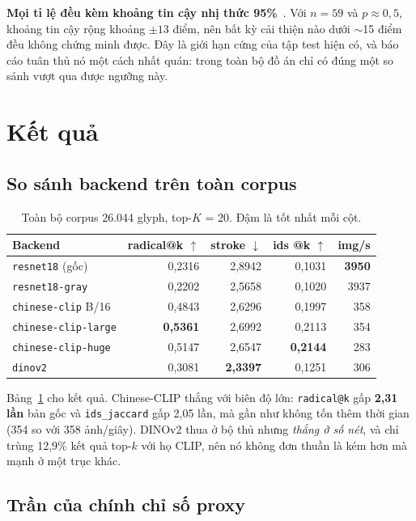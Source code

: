\documentclass[conference,a4paper]{IEEEtran}
\newcommand{\code}[1]{{\small\texttt{#1}}}
\begin{document}
\textbf{Mọi tỉ lệ đều kèm khoảng tin cậy nhị thức 95\%}~\cite{wilson}. Với $n = 59$ và $p \approx
0{,}5$, khoảng tin cậy rộng khoảng $\pm13$ điểm, nên bất kỳ cải thiện nào dưới $\sim$15 điểm đều
không chứng minh được. Đây là giới hạn cứng của tập test hiện có, và báo cáo tuân thủ nó một cách
nhất quán: trong toàn bộ đồ án chỉ có đúng một so sánh vượt qua được ngưỡng này.

\section{Kết quả}

\subsection{So sánh backend trên toàn corpus}

\begin{table}[t]
\caption{Toàn bộ corpus 26.044 glyph, top-$K$ = 20. Đậm là tốt nhất mỗi cột.}
\label{tab:backend}
\centering\footnotesize
\begin{tabular}{@{}lrrrr@{}}
\toprule
Backend & radical@k $\uparrow$ & stroke $\downarrow$ & ids @k $\uparrow$ & img/s \\
\midrule
\code{resnet18} (gốc)      & 0,2316 & 2,8942 & 0,1031 & \textbf{3950} \\
\code{resnet18-gray}       & 0,2202 & 2,5658 & 0,1020 & 3937 \\
\code{chinese-clip} B/16   & 0,4843 & 2,6296 & 0,1997 & 358 \\
\code{chinese-clip-large}  & \textbf{0,5361} & 2,6992 & 0,2113 & 354 \\
\code{chinese-clip-huge}   & 0,5147 & 2,6547 & \textbf{0,2144} & 283 \\
\code{dinov2}              & 0,3081 & \textbf{2,3397} & 0,1251 & 306 \\
\bottomrule
\end{tabular}
\end{table}

Bảng~\ref{tab:backend} cho kết quả. Chinese-CLIP thắng với biên độ lớn: \code{radical@k} gấp \textbf{2,31 lần} bản gốc và
\code{ids\_jaccard} gấp 2,05 lần, mà gần như không tốn thêm thời gian (354 so với 358 ảnh/giây).
DINOv2 thua ở bộ thủ nhưng \emph{thắng ở số nét}, và chỉ trùng 12,9\% kết quả top-$k$ với họ CLIP,
nên nó không đơn thuần là kém hơn mà mạnh ở một trục khác.

\subsection{Trần của chính chỉ số proxy}
\end{document}
